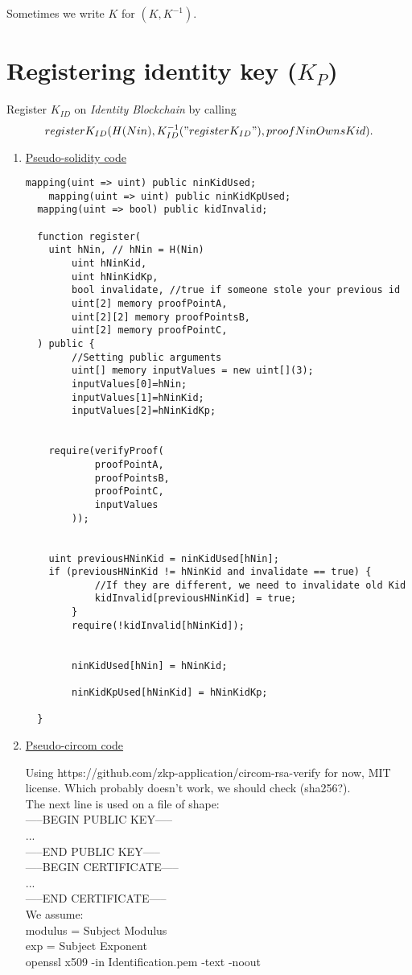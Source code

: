 \documentclass{article}
\newcommand{\khk}{K_{P}}
\newcommand{\kid}{K_{ID}}
\newcommand{\pbc}{\textit{Identity Blockchain}}
\begin{document}
Sometimes we write $K$ for $(K, K^{-1})$.

\newpage
\section{Registering identity key ($\khk$)}
Register $\kid$ on \pbc{} by calling $$register\kid(H(Nin), \kid^{-1}("register\kid"), proofNinOwnsKid).$$
\begin{enumerate}[leftmargin=0cm]
\item[] \underline{Pseudo-solidity code}

\hfill\begin{minipage}{\dimexpr\textwidth-20px}
\begin{lstlisting}[language=Solidity]
  mapping(uint => uint) public ninKidUsed;
	mapping(uint => uint) public ninKidKpUsed;
  mapping(uint => bool) public kidInvalid;

  function register(
    uint hNin, // hNin = H(Nin)
		uint hNinKid,
		uint hNinKidKp,
		bool invalidate, //true if someone stole your previous id
		uint[2] memory proofPointA,
		uint[2][2] memory proofPointsB,
		uint[2] memory proofPointC,
  ) public {
		//Setting public arguments
		uint[] memory inputValues = new uint[](3);
		inputValues[0]=hNin;
		inputValues[1]=hNinKid;
		inputValues[2]=hNinKidKp;


    require(verifyProof(
			proofPointA,
			proofPointsB,
			proofPointC,
			inputValues
		));


    uint previousHNinKid = ninKidUsed[hNin];
    if (previousHNinKid != hNinKid and invalidate == true) {
			//If they are different, we need to invalidate old Kid
			kidInvalid[previousHNinKid] = true;
		}
		require(!kidInvalid[hNinKid]);


		ninKidUsed[hNin] = hNinKid;

		ninKidKpUsed[hNinKid] = hNinKidKp;

  }

\end{lstlisting}
\xdef\tpd{\the\prevdepth}
\end{minipage}

\item[] \underline{Pseudo-circom code}

Using https://github.com/zkp-application/circom-rsa-verify for now, MIT license.
Which probably doesn't work, we should check (sha256?). \\
The next line is used on a file of shape:\\
-----BEGIN PUBLIC KEY-----\\
...\\
-----END PUBLIC KEY-----\\
-----BEGIN CERTIFICATE-----\\
...\\
-----END CERTIFICATE-----\\
We assume: \\
	modulus = Subject Modulus\\
	exp = Subject Exponent\\
openssl x509 -in Identification.pem -text -noout\\


\end{enumerate}
\end{document}

